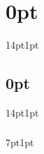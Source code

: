 \titlespacing\section{0pt}{14pt}{1pt} %
\titlespacing\subsection{0pt}{14pt}{1pt}
\titlespacing\subsubsection{\parindent}{7pt}{1pt} %

\setlength{\parskip}{0pt}